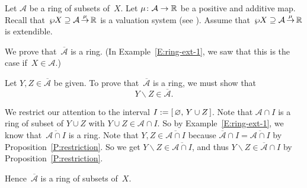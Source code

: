 \documentclass[main.tex]{subfiles}
\begin{document}
%
%
\begin{ex}
Let $\mathcal{A}$
be a ring of subsets of~$X$.
Let $\mu\colon \mathcal A \rightarrow \mathbb{R}$
be a positive and additive map.
Recall that~$\wp X \supseteq \mathcal{A}\,\smash{\stackrel{\mu}{\rightarrow}}\,\mathbb{R}$
is a valuation system (see ).
Assume that~$\wp X \supseteq \mathcal{A}\,\smash{\stackrel{\mu}{\rightarrow}}\,\mathbb{R}$
is extendible.

We prove that~$\overline{\mathcal{A}}$ is a ring.
(In Example~\ref{E:ring-ext-1},
we saw that this
is the case if~$X\in \mathcal{A}$.)

Let $Y,Z\in\overline{\mathcal{A}}$ be given.
To prove that~$\overline{\mathcal{A}}$
is a ring,
we must show that
\begin{equation*}
Y\backslash Z\in\overline{\mathcal{A}}.
\end{equation*}

We restrict our attention to the interval $I:= [\,\varnothing,\, Y\cup Z\,]$.
Note that $\mathcal{A}\cap I$ is a ring of subset of $Y\cup Z$
with $Y\cup Z\in\mathcal{A}\cap I$.
So by Example~\ref{E:ring-ext-1},
we know that~$\overline{\mathcal{A}\cap I}$ is a ring.
Note that 
$Y,Z\in\overline{\mathcal{A}\cap I}$
because $\overline{\mathcal A} \cap I 
= \overline{ \mathcal A \cap I}$
by Proposition~\ref{P:restriction}.
So we get $Y\backslash Z\in \overline{\mathcal{A}\cap I}$,
and thus $Y\backslash Z\in \overline{\mathcal{A}}\cap I$
by Proposition~\ref{P:restriction}.

Hence~$\overline{\mathcal{A}}$ is a ring of subsets of~$X$.
\end{ex}
\end{document}
